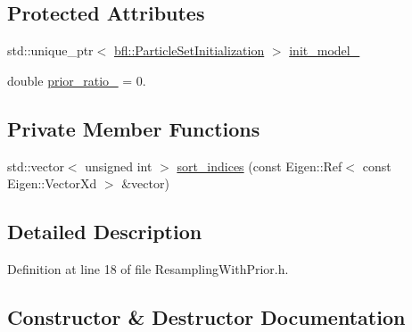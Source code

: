 \subsection*{Protected Attributes}
\begin{DoxyCompactItemize}
\item 
std\+::unique\+\_\+ptr$<$ \mbox{\hyperlink{classbfl_1_1ParticleSetInitialization}{bfl\+::\+Particle\+Set\+Initialization}} $>$ \mbox{\hyperlink{classbfl_1_1ResamplingWithPrior_a8c04b13a27ef22963b1e5ea0a6db4daf}{init\+\_\+model\+\_\+}}
\item 
double \mbox{\hyperlink{classbfl_1_1ResamplingWithPrior_a5f2d0d6f948348428a992232de091c66}{prior\+\_\+ratio\+\_\+}} = 0.
\end{DoxyCompactItemize}
\subsection*{Private Member Functions}
\begin{DoxyCompactItemize}
\item 
std\+::vector$<$ unsigned int $>$ \mbox{\hyperlink{classbfl_1_1ResamplingWithPrior_a0a0aa4d6c2f20b56edcb8d53f63afe09}{sort\+\_\+indices}} (const Eigen\+::\+Ref$<$ const Eigen\+::\+Vector\+Xd $>$ \&vector)
\end{DoxyCompactItemize}


\subsection{Detailed Description}


Definition at line 18 of file Resampling\+With\+Prior.\+h.



\subsection{Constructor \& Destructor Documentation}
\mbox{\label{classbfl_1_1ResamplingWithPrior_a91d50339c774691e5ccf587dbbb71ecc}} 
